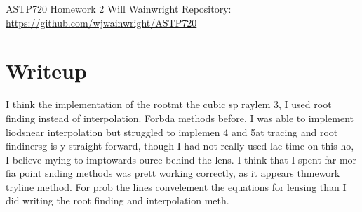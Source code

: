 \documentclass[twocolumn,11pt]{article}
\begin{document}
\pagestyle{plain}
\onecolumn
ASTP720 
\newline Homework 2
\newline Will Wainwright
\newline Repository: \href{https://github.com/wjwainwright/ASTP720}{https://github.com/wjwainwright/ASTP720}

\section*{Writeup}
I think the implementation of the rootmt the cubic sp raylem 3, I used root finding instead of interpolation. Forbda methods before. I was able to implement liodsnear interpolation but struggled to implemen 4 and 5at tracing and root findinersg is y straight forward, though I had not really used lae time on this ho, I believe mying to imptowards ource behind the lens. I think that I spent far mor fia point snding methods was prett working correctly, as it appears thmework tryline method. For prob the lines convelement the equations for lensing than I did writing the root finding and interpolation meth.

\begin{figure}[!h]
	\centering
	\noindent
      \caption{}
\end{figure}
\end{document}
